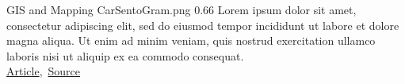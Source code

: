 \cvexample
  {GIS and Mapping}
  {CarSentoGram.png}
  {0.66}
  {%
    Lorem ipsum dolor sit amet, consectetur adipiscing elit, sed do eiusmod tempor incididunt ut labore et dolore magna aliqua.
    Ut enim ad minim veniam, quis nostrud exercitation ullamco laboris nisi ut aliquip ex ea commodo consequat.\\
    \raggedleft\href{https://www.tandfonline.com/doi/full/10.1080/15230406.2018.1510343}{Article},\, \href{https://github.com/ryan-p-larson/paper}{Source}
}